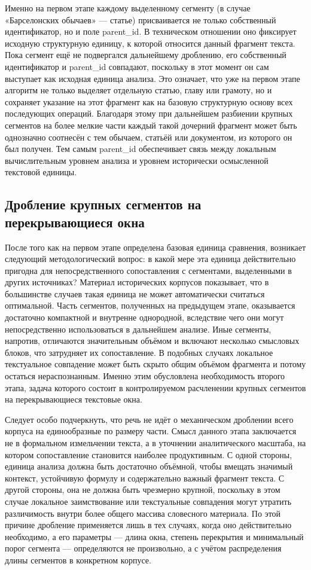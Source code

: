 Именно на первом этапе каждому выделенному сегменту (в случае «Барселонских обычаев» --- статье) присваивается не только собственный идентификатор, но и поле parent\_id. В техническом отношении оно фиксирует исходную структурную единицу, к которой относится данный фрагмент текста. Пока сегмент ещё не подвергался дальнейшему дроблению, его собственный идентификатор и parent\_id совпадают, поскольку в этот момент он сам выступает как исходная единица анализа. Это означает, что уже на первом этапе алгоритм не только выделяет отдельную статью, главу или грамоту, но и сохраняет указание на этот фрагмент как на базовую структурную основу всех последующих операций. Благодаря этому при дальнейшем разбиении крупных сегментов на более мелкие части каждый такой дочерний фрагмент может быть однозначно соотнесён с тем обычаем, статьёй или документом, из которого он был получен. Тем самым parent\_id обеспечивает связь между локальным вычислительным уровнем анализа и уровнем исторически осмысленной текстовой единицы.

\subsection{Дробление крупных сегментов на перекрывающиеся окна}

После того как на первом этапе определена базовая единица сравнения, возникает следующий методологический вопрос: в какой мере эта единица действительно пригодна для непосредственного сопоставления с сегментами, выделенными в других источниках? Материал исторических корпусов показывает, что в большинстве случаев такая единица не может автоматически считаться оптимальной. Часть сегментов, полученных на предыдущем этапе, оказывается достаточно компактной и внутренне однородной, вследствие чего они могут непосредственно использоваться в дальнейшем анализе. Иные сегменты, напротив, отличаются значительным объёмом и включают несколько смысловых блоков, что затрудняет их сопоставление. В подобных случаях локальное текстуальное совпадение может быть скрыто общим объёмом фрагмента и потому остаться нераспознанным. Именно этим обусловлена необходимость второго этапа, задача которого состоит в контролируемом расчленении крупных сегментов на перекрывающиеся текстовые окна.

Следует особо подчеркнуть, что речь не идёт о механическом дроблении всего корпуса на единообразные по размеру части. Смысл данного этапа заключается не в формальном измельчении текста, а в уточнении аналитического масштаба, на котором сопоставление становится наиболее продуктивным. С одной стороны, единица анализа должна быть достаточно объёмной, чтобы вмещать значимый контекст, устойчивую формулу и содержательно важный фрагмент текста. С другой стороны, она не должна быть чрезмерно крупной, поскольку в этом случае локальное заимствование или текстуальные совпадения могут утратить различимость внутри более общего массива словесного материала. По этой причине дробление применяется лишь в тех случаях, когда оно действительно необходимо, а его параметры --- длина окна, степень перекрытия и минимальный порог сегмента --- определяются не произвольно, а с учётом распределения длины сегментов в конкретном корпусе.

